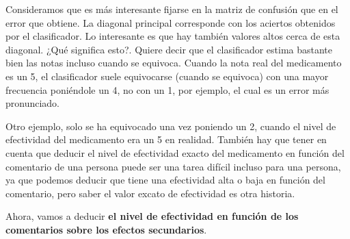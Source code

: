 \documentclass[spanish,]{article}
\newenvironment{Shaded}{\begin{snugshade}}{\end{snugshade}}
\newcommand{\KeywordTok}[1]{\textcolor[rgb]{0.13,0.29,0.53}{\textbf{#1}}}
\newcommand{\OperatorTok}[1]{\textcolor[rgb]{0.81,0.36,0.00}{\textbf{#1}}}
\newcommand{\NormalTok}[1]{#1}
\begin{document}
Consideramos que es más interesante fijarse en la matriz de confusión
que en el error que obtiene. La diagonal principal corresponde con los
aciertos obtenidos por el clasificador. Lo interesante es que hay
también valores altos cerca de esta diagonal. ¿Qué significa esto?.
Quiere decir que el clasificador estima bastante bien las notas incluso
cuando se equivoca. Cuando la nota real del medicamento es un 5, el
clasificador suele equivocarse (cuando se equivoca) con una mayor
frecuencia poniéndole un 4, no con un 1, por ejemplo, el cual es un
error más pronunciado.

Otro ejemplo, solo se ha equivocado una vez poniendo un 2, cuando el
nivel de efectividad del medicamento era un 5 en realidad. También hay
que tener en cuenta que deducir el nivel de efectividad exacto del
medicamento en función del comentario de una persona puede ser una tarea
difícil incluso para una persona, ya que podemos deducir que tiene una
efectividad alta o baja en función del comentario, pero saber el valor
excato de efectividad es otra historia.

Ahora, vamos a deducir \textbf{el nivel de efectividad en función de los
comentarios sobre los efectos secundarios}.

\begin{Shaded}
\end{Shaded}
\end{document}

